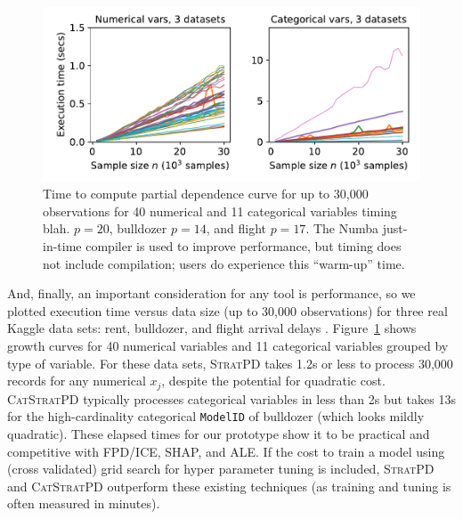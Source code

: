 \documentclass[]{article} %
\newcommand{\figref}[1]{Figure~\ref{#1}}
\newcommand{\cut}[1]{}
\newcommand{\spd}{\fontfamily{cmr}\textsc{\small StratPD}}
\newcommand{\cspd}{\fontfamily{cmr}\textsc{\small CatStratPD}}
\begin{document}
\begin{figure}[!htbp]
\begin{center}
\includegraphics[scale=.45]{images/timing.pdf}\vspace{-3mm}
\caption{\small Time to compute partial dependence curve for up to 30,000 observations for 40 numerical and 11 categorical variables timing blah. $p=20$, bulldozer $p=14$, and flight $p=17$. The Numba just-in-time compiler is used to improve performance, but timing does not include compilation; users do experience this ``warm-up'' time.}
\label{fig:timing}
\end{center}
\end{figure}

And, finally, an important consideration for any tool is performance, so we plotted execution time versus data size (up to 30,000 observations) for three real Kaggle data sets: rent, bulldozer, and flight arrival delays \citep{flights}. \figref{fig:timing} shows growth curves for 40 numerical variables and 11 categorical variables grouped by type of variable.  For these data sets, \spd{} takes 1.2s or less to process 30,000 records for any  numerical $x_j$, despite the potential for quadratic cost. \cspd{} typically processes categorical variables in less than 2s but takes 13s for the high-cardinality categorical {\tt\small ModelID} of bulldozer (which looks mildly quadratic).  These elapsed times for our prototype show it to be practical and competitive with FPD/ICE, SHAP, and ALE.  If the cost to train a model using (cross validated) grid search for hyper parameter tuning is included, \spd{} and \cspd{} outperform these existing techniques (as training and tuning is often measured in minutes).


\cut{
flight shape (5714008, 17), 6 cats
rent shape (49352, 20), no cats
bulldozer shape (362781, 14) records, 5 cats
}

\end{document}
